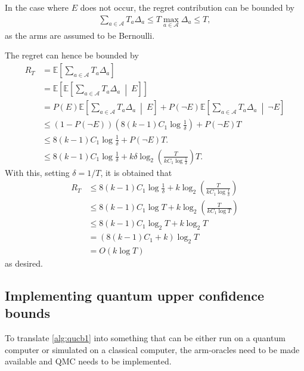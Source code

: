 In the case where $E$ does not occur, the regret contribution can be bounded by
\begin{equation}
    \begin{aligned}
        \sum_{a \in \mathcal{A}} T_a \Delta_a \leq T \max_{a\in \mathcal{A}} \Delta_a \leq T,
    \end{aligned}
\end{equation}
as the arms are assumed to be Bernoulli.

The regret can hence be bounded by
\begin{equation}
    \begin{aligned}
        R_T
         & =
        \mathbb{E}\left[ \sum_{a \in \mathcal{A}} T_a \Delta_a \right]
        \\
         & =
        \mathbb{E}\left[ \mathbb{E}\left[ \sum_{a \in \mathcal{A}} T_a \Delta_a \ \middle| \ E \right] \right]
        \\
         & = P(E) \mathbb{E}\left[ \sum_{a \in \mathcal{A}} T_a \Delta_a \ \middle| \ E \right] + P(\neg E) \mathbb{E}\left[ \sum_{a \in \mathcal{A}} T_a \Delta_a \ \middle| \ \neg E \right]
        \\
         & \leq
        (1 - P(\neg E)) \left( 8(k-1)C_1 \log \frac1\delta \right)
        + P(\neg E) T
        \\
         & \leq
        8(k-1)C_1 \log \frac1\delta + P(\neg E) T.
        \\
         & \leq
        8(k-1)C_1 \log \frac1\delta + k\delta \log_2 \left(\frac{T}{kC_1 \log \frac1\delta}\right) T.
    \end{aligned}
\end{equation}
With this, setting $\delta = 1/T$, it is obtained that
\begin{equation}
    \begin{aligned}
        R_T
         & \leq
        8(k-1)C_1 \log \frac1\delta + k \log_2 \left(\frac{T}{kC_1 \log \frac1\delta}\right)
        \\
         & \leq
        8(k-1)C_1 \log T + k \log_2 \left(\frac{T}{kC_1 \log T}\right)
        \\
         & \leq
        8(k-1)C_1 \log_2 T + k \log_2 T
        \\
         & =
        (8(k-1)C_1 + k) \log_2 T
        \\
         & =
        O(k \log T)
    \end{aligned}
\end{equation}
as desired.

\subsection{Implementing quantum upper confidence bounds}
To translate \cref{alg:qucb1} into something that can be either run on a quantum computer or simulated on a classical computer, the arm-oracles need to be made available and QMC needs to be implemented.

